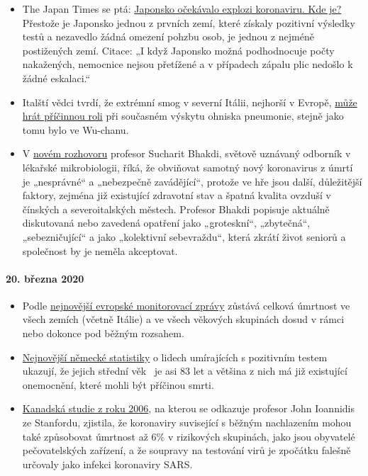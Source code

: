 \begin{itemize}
\tightlist
\item
  The Japan Times se ptá:
  \href{https://www.japantimes.co.jp/news/2020/03/20/national/coronavirus-explosion-expected-japan/}{Japonsko
  očekávalo explozi koronaviru. Kde je?} Přestože je Japonsko jednou z
  prvních zemí, které získaly pozitivní výsledky testů a nezavedlo žádná
  omezení pohzbu osob, je jednou z nejméně postižených zemí. Citace: „I
  když Japonsko možná podhodnocuje počty nakažených, nemocnice nejsou
  přetížené a v případech zápalu plic nedošlo k žádné eskalaci.``
\item
  Italští vědci tvrdí, že extrémní smog v severní Itálii, nejhorší v
  Evropě,
  \href{https://www.heise.de/tp/features/Feinstaubpartikel-als-Viren-Vehikel-4687454.html}{může
  hrát příčinnou roli} při současném výskytu ohniska pneumonie, stejně
  jako tomu bylo ve Wu-chanu.
\item
  V \href{https://www.youtube.com/watch?v=JBB9bA-gXL4}{novém rozhovoru}
  profesor Sucharit Bhakdi, světově uznávaný odborník v lékařské
  mikrobiologii, říká, že obviňovat samotný nový koronavirus z úmrtí je
  „nesprávné`` a „nebezpečně zavádějící``, protože ve hře jsou další,
  důležitější faktory, zejména již existující zdravotní stav a špatná
  kvalita ovzduší v čínských a severoitalských městech. Profesor Bhakdi
  popisuje aktuálně diskutovaná nebo zavedená opatření jako
  „groteskní``, „zbytečná``, „sebezničující`` a jako „kolektivní
  sebevraždu``, která zkrátí život seniorů a společnost by je neměla
  akceptovat.
\end{itemize}

\hypertarget{20-bux159ezna-2020}{%
\paragraph{20. března 2020}\label{20-bux159ezna-2020}}

\begin{itemize}
\tightlist
\item
  Podle \href{https://www.euromomo.eu/index.html}{nejnovější evropské
  monitorovací zprávy} zůstává celková úmrtnost ve všech zemích (včetně
  Itálie) a ve všech věkových skupinách dosud v rámci nebo dokonce pod
  běžným rozsahem.
\item
  \href{https://de.wikipedia.org/wiki/COVID-19-Pandemie_in_Deutschland\#Todesf\%C3\%A4lle_in_den_Medien}{Nejnovější
  německé statistiky} o lidech umírajících s pozitivním testem ukazují,
  že jejich střední věk~ je asi 83 let a většina z nich má již
  existující onemocnění, které mohli být příčinou smrti.
\item
  \href{https://www.ncbi.nlm.nih.gov/pmc/articles/PMC2095096/}{Kanadská
  studie z roku 2006}, na kterou se odkazuje profesor John Ioannidis ze
  Stanfordu, zjistila, že koronaviry suvisející s běžným nachlazením
  mohou také způsobovat úmrtnost až 6\% v rizikových skupinách, jako
  jsou obyvatelé pečovatelských zařízení, a že soupravy na testování
  virů je zpočátku falešně určovaly jako infekci koronaviry SARS.
\end{itemize}

